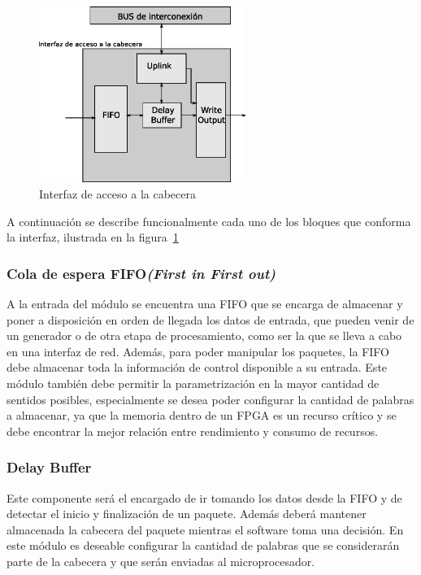  \begin{figure}[h]
  \centering
	 \includegraphics[width=0.6\textwidth]{2-sistema/graf/modulo.eps}
  \caption{Interfaz de acceso a la cabecera}
  \label{fig:inter}
\end{figure}




A continuación se describe funcionalmente cada uno de los bloques que conforma la interfaz, ilustrada en la figura~\ref{fig:inter}
\subsubsection{Cola de espera FIFO\textit{(First in First out)}}
A la entrada del módulo se encuentra una FIFO que se encarga de almacenar y poner a disposición en orden de llegada los datos de entrada, que pueden venir de un generador o de otra etapa de procesamiento, como ser la que se lleva a cabo en una interfaz de red. Además, para poder manipular los paquetes, la FIFO debe almacenar toda la información de control disponible a su entrada.
Este módulo también debe permitir la parametrización en la mayor cantidad de sentidos posibles, especialmente se desea poder configurar la cantidad de palabras a almacenar, ya que la memoria dentro de un FPGA es un recurso crítico y se debe encontrar la mejor relación entre rendimiento y consumo de recursos.

\subsubsection{Delay Buffer}
Este componente será el encargado de ir tomando los datos desde la FIFO y de detectar el inicio y finalización de un paquete. Además deberá mantener almacenada la cabecera del paquete mientras el software toma una decisión. En este módulo es deseable configurar la cantidad de palabras que se considerarán parte de la cabecera y que serán enviadas al microprocesador.

